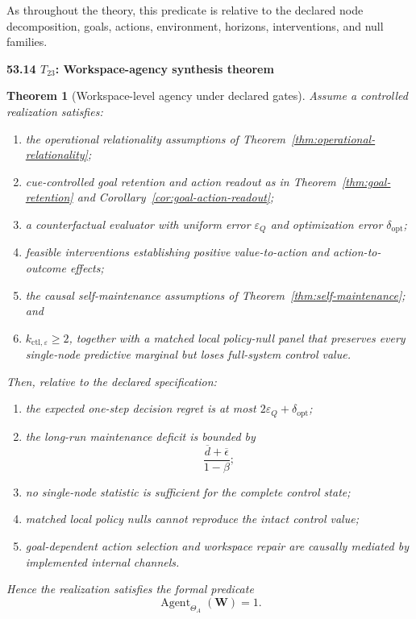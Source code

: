 \documentclass[11pt,letterpaper]{article}
\newcommand{\Workspace}{\mathbf W}
\newcommand{\subtopic}[1]{%
 \vspace{0.45em}
 {\bfseries\color{AccentColor} #1\par}
}
\theoremstyle{plain}
\newtheorem{theorem}{Theorem}
\theoremstyle{definition}
\begin{document}
As throughout the theory, this predicate is relative to the declared node
decomposition, goals, actions, environment, horizons, interventions, and null
families.

\subtopic{53.14 \(T_{23}\): Workspace-agency synthesis theorem }

\begin{theorem}[Workspace-level agency under declared gates]
\label{thm:agency-synthesis}
Assume a controlled realization satisfies:
\begin{enumerate}
\item the operational relationality assumptions of
 Theorem~\ref{thm:operational-relationality};
\item cue-controlled goal retention and action readout as in
 Theorem~\ref{thm:goal-retention} and
 Corollary~\ref{cor:goal-action-readout};
\item a counterfactual evaluator with uniform error \(\varepsilon_Q\) and
 optimization error \(\delta_{\mathrm{opt}}\);
\item feasible interventions establishing positive value-to-action and
 action-to-outcome effects;
\item the causal self-maintenance assumptions of
 Theorem~\ref{thm:self-maintenance}; and
\item \(k_{\mathrm{ctl},\varepsilon}\geq2\), together with a matched local
 policy-null panel that preserves every single-node predictive marginal
 but loses full-system control value.
\end{enumerate}
Then, relative to the declared specification:
\begin{enumerate}
\item the expected one-step decision regret is at most
 \(2\varepsilon_Q+\delta_{\mathrm{opt}}\);
\item the long-run maintenance deficit is bounded by
 \[
 \frac{\overline d+\overline\epsilon}{1-\beta};
 \]
\item no single-node statistic is sufficient for the complete control state;
\item matched local policy nulls cannot reproduce the intact control value;
\item goal-dependent action selection and workspace repair are causally
 mediated by implemented internal channels.
\end{enumerate}
Hence the realization satisfies the formal predicate
\[
\operatorname{Agent}_{\Theta_A}(\Workspace)=1.
\]
\end{theorem}
\end{document}
